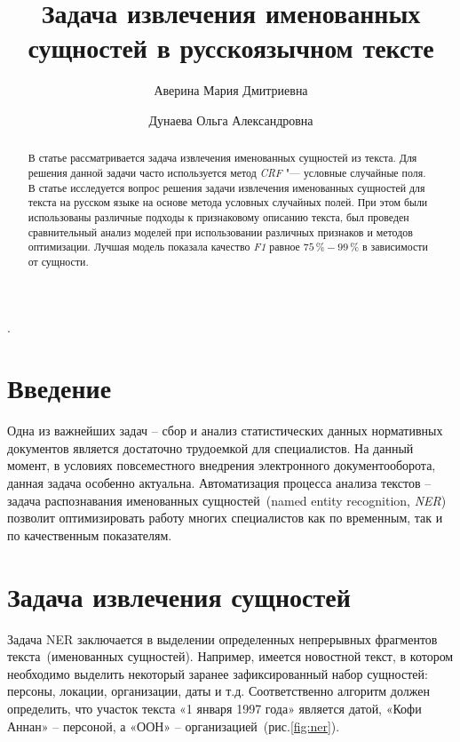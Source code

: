\documentclass{csmathnotes}
\title{Задача извлечения именованных сущностей в русскоязычном тексте}
\author{Аверина Мария Дмитриевна}
\affiliation{Ярославский государственный университет им. П.\,Г. Демидова}
\author{Дунаева Ольга Александровна}
\affiliation{Ярославский государственный университет им. П.\,Г. Демидова}
\begin{document}
\maketitle

\begin{abstract}
В статье рассматривается задача извлечения именованных сущностей из текста.
Для решения данной задачи часто используется метод \emph{CRF} "--- условные случайные поля.
В статье исследуется вопрос решения задачи извлечения именованных сущностей для текста на русском языке на основе метода условных случайных полей.
При этом были использованы различные подходы к признаковому описанию текста,
был проведен сравнительный анализ моделей при использовании различных признаков и методов оптимизации.
Лучшая модель показала качество \emph{F1} равное $75\,\% - 99\,\%$ в зависимости от сущности.
\end{abstract}

.

\section*{Введение}
Одна из важнейших задач – сбор и анализ статистических данных нормативных
документов является достаточно трудоемкой для специалистов. На данный момент, в условиях повсеместного внедрения электронного документооборота, данная задача особенно актуальна. Автоматизация процесса анализа текстов – задача распознавания именованных сущностей~(named entity recognition, \emph{NER})~\cite{base} позволит оптимизировать работу многих специалистов как по временным, так и по качественным показателям.


\section*{Задача извлечения сущностей}

Задача NER заключается в выделении определенных непрерывных фрагментов текста~(именованных сущностей).
Например, имеется новостной текст, в котором необходимо выделить некоторый заранее зафиксированный набор сущностей: персоны, локации, организации, даты и т.д.
Соответственно алгоритм должен определить, что участок текста «1 января 1997 года» является датой, «Кофи Аннан» – персоной, а «ООН» – организацией~(рис.\ref{fig:ner}).
\end{document}

